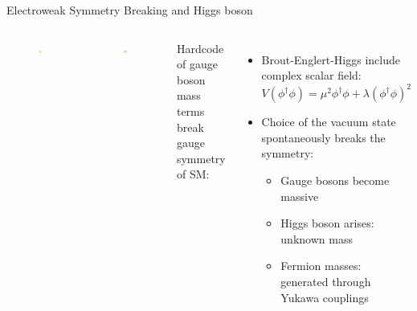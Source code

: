 \begin{frame}{Electroweak Symmetry Breaking and Higgs boson}

\begin{columns}
\begin{figure}
    \centering
    \includegraphics[width=0.8\textwidth]{Part1/Img/Higgs-Potential-lookdown.png}
\end{figure}
\begin{figure}
    \centering
    \includegraphics[width=0.8\textwidth]{Part1/Img/Goldstone-Eaten-four.png}
\end{figure}

Hardcode of gauge boson mass terms break gauge symmetry of SM:
\begin{itemize}
    \item \textcolor{structurColor}{Brout-Englert-Higgs} include complex scalar field: $V(\phi^\dagger\phi) = \mu^2\phi^\dagger\phi + \lambda(\phi^\dagger\phi)^2$
    \item Choice of the vacuum state \textcolor{applegreen}{spontaneously breaks the symmetry}:
    \begin{itemize}
        \item Gauge bosons become massive
        \item Higgs boson arises: unknown mass
        \item Fermion masses: generated through Yukawa couplings
    \end{itemize}
\end{itemize}


\end{columns}
\end{frame}
